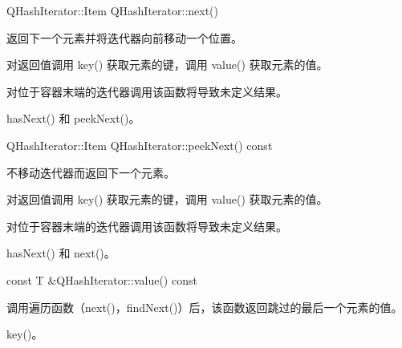 QHashIterator::Item QHashIterator::next()

返回下一个元素并将迭代器向前移动一个位置。

对返回值调用 key() 获取元素的键，调用 value() 获取元素的值。

对位于容器末端的迭代器调用该函数将导致未定义结果。



\begin{notice}[另请参阅]
hasNext() 和 peekNext()。
\end{notice}

QHashIterator::Item QHashIterator::peekNext() const

不移动迭代器而返回下一个元素。

对返回值调用 key() 获取元素的键，调用 value() 获取元素的值。

对位于容器末端的迭代器调用该函数将导致未定义结果。


\begin{notice}[另请参阅]
hasNext() 和 next()。
\end{notice}

const T \&QHashIterator::value() const

调用遍历函数（next()，findNext()）后，该函数返回跳过的最后一个元素的值。

\begin{notice}[另请参阅]
key()。
\end{notice}

